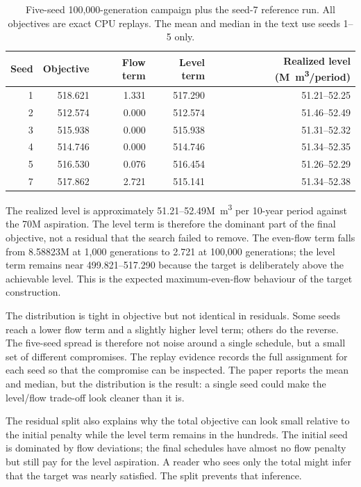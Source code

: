 \documentclass[preprint,11pt]{elsarticle}
\begin{document}
\begin{table}[t]
\centering
\caption{Five-seed 100,000-generation campaign plus the seed-7 reference run. All objectives are exact CPU replays. The mean and median in the text use seeds 1--5 only.}
\label{tab:seeds}
\small
\begin{tabular}{rrrrr}
\toprule
Seed & Objective & Flow term & Level term & Realized level (M~m\textsuperscript{3}/period) \\
\midrule
1 & 518.621 & 1.331 & 517.290 & 51.21--52.25 \\
2 & 512.574 & 0.000 & 512.574 & 51.46--52.49 \\
3 & 515.938 & 0.000 & 515.938 & 51.31--52.32 \\
4 & 514.746 & 0.000 & 514.746 & 51.34--52.35 \\
5 & 516.530 & 0.076 & 516.454 & 51.26--52.29 \\
7 & 517.862 & 2.721 & 515.141 & 51.34--52.38 \\
\bottomrule
\end{tabular}
\end{table}



The realized level is approximately 51.21--52.49M~m\textsuperscript{3} per
10-year period against the 70M aspiration. The level term is therefore the
dominant part of the final objective, not a residual that the search failed to
remove. The even-flow term falls from 8.58823M at 1,000 generations to 2.721 at
100,000 generations; the level term remains near 499.821--517.290 because the target is
deliberately above the achievable level. This is the expected maximum-even-flow
behaviour of the target construction.

The distribution is tight in objective but not identical in residuals. Some seeds reach a lower flow
term and a slightly higher level term; others do the reverse. The five-seed spread is therefore not
noise around a single schedule, but a small set of different compromises. The replay evidence records
the full assignment for each seed so that the compromise can be inspected. The paper reports the
mean and median, but the distribution is the result: a single seed could make the level/flow trade-off
look cleaner than it is.

The residual split also explains why the total objective can look small relative to the initial
penalty while the level term remains in the hundreds. The initial seed is dominated by flow deviations;
the final schedules have almost no flow penalty but still pay for the level aspiration. A reader who
sees only the total might infer that the target was nearly satisfied. The split prevents that
inference.
\end{document}
